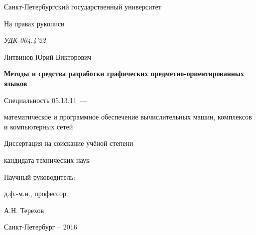 \thispagestyle{empty}

\begin{center}
Санкт-Петербургский государственный университет\par
\par 
\par
\end{center}

\vspace{20mm}
\begin{flushright}
На правах рукописи

{\sl УДК 004.4'22}
\end{flushright}

\vspace{25mm}
\begin{center}
{\large Литвинов Юрий Викторович}
\end{center}

\vspace{5mm}
\begin{center}
{\bf \large Методы и средства разработки графических предметно-ориентированных языков
\par}

\vspace{10mm}
{%
Специальность 05.13.11~---

математическое и программное обеспечение вычислительных машин, комплексов и компьютерных сетей
}

\vspace{10mm}
Диссертация на соискание учёной степени

кандидата технических наук
\end{center}

\vspace{20mm}
\begin{flushright}
Научный руководитель:

д.ф.-м.н., профессор

А.Н. Терехов

\end{flushright}

\vspace{20mm}
\begin{center}
{Санкт-Петербург -- 2016}
\end{center}

\newpage